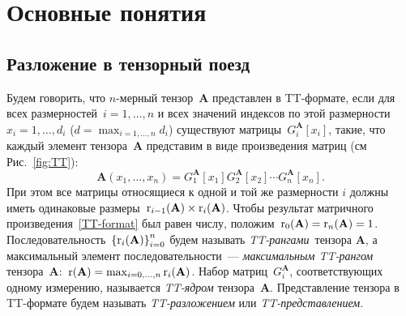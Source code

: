 \chapter{Основные понятия} \label{chap:definitions}

\section{Разложение в тензорный поезд} \label{sec:tt-decomposition}

%     

Будем говорить, что $n$-мерный тензор~$\mathbf{A}$ представлен в TT\hyp{}формате, если для всех размерностей~$i=1,\ldots,n$ и всех значений индексов по этой размерности~$x_i = 1, \ldots, d_i$ ($d = \max_{i=1,\ldots,n} d_i$) существуют матрицы~$G_i^{\mathbf{A}}[x_i]$, такие, что каждый элемент тензора~$\mathbf{A}$ представим в виде произведения матриц (см Рис.~\ref{fig:TT}):
\begin{equation}
\label{TT-format}
\mathbf{A}(x_1, \dots, x_n) = G_1^{\mathbf{A}}[x_1] G^{\mathbf{A}}_2[x_2] \dotsm G^{\mathbf{A}}_n[x_n].
\end{equation}
При этом все матрицы относящиеся к одной и той же размерности $i$ должны иметь одинаковые размеры~$\operatorname{r}_{i-1}(\mathbf{A}) \times \operatorname{r}_i(\mathbf{A})$. Чтобы результат матричного произведения~\eqref{TT-format} был равен числу, положим~$\operatorname{r}_{0}(\mathbf{A}) = \operatorname{r}_{n}(\mathbf{A}) = 1$. Последовательность~$\left\{\operatorname{r}_i(\mathbf{A})\right\}_{i=0}^n$ будем называть \emph{TT\hyp{}рангами}~тензора $\mathbf{A}$, а максимальный элемент последовательности~--- \emph{максимальным TT\hyp{}рангом} тензора~$\mathbf{A}$:~$\operatorname{r}(\mathbf{A}) = \max_{i = 0, \dots, n} \operatorname{r}_i(\mathbf{A})$.
Набор матриц~$G^{\mathbf{A}}_i$, соответствующих одному измерению, называется \emph{TT\hyp{}ядром} тензора~$\mathbf{A}$.
Представление тензора в TT\hyp{}формате будем называть \emph{TT\hyp{}разложением} или \emph{TT\hyp{}представлением}.


